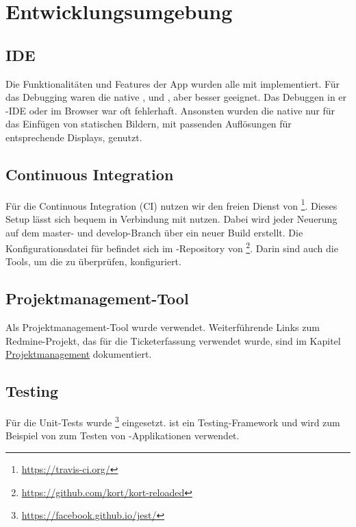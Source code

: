 \chapter{Entwicklungsumgebung}
\label{pd-entwicklungsumgebung}


\section{IDE}
Die Funktionalitäten und Features der App wurden alle mit  implementiert. 
Für das Debugging waren die native ,  und , aber besser geeignet. 
Das Debuggen in er -\gls{IDE} oder im  Browser war oft fehlerhaft. 
Ansonsten wurden die native  nur für das Einfügen von statischen Bildern, mit passenden Auflösungen für entsprechende Displays, genutzt. 


\section{Continuous Integration}
Für die Continuous Integration (\gls{CI}) nutzen wir den freien Dienst von \footnote{\url{https://travis-ci.org/}}.
Dieses Setup lässt sich bequem in Verbindung mit  nutzen. 
Dabei wird jeder Neuerung auf dem master- und develop-Branch über  ein neuer Build erstellt. 
Die Konfigurationsdatei für  befindet sich im -Repository von \kort{}\footnote{\url{https://github.com/kort/kort-reloaded}}. 
Darin sind auch die Tools, um die  zu überprüfen, konfiguriert. 


\section{Projektmanagement-Tool}
Als Projektmanagement-Tool wurde  verwendet. 
Weiterführende Links zum Redmine-Projekt, das für die Ticketerfassung verwendet wurde, sind im Kapitel \hyperref[pm-projektmanagement]{Projektmanagement} dokumentiert.


\section{Testing}
Für die Unit-Tests wurde \footnote{\url{https://facebook.github.io/jest/}} eingesetzt. 
 ist ein  Testing-\gls{Framework} und wird zum Beispiel von  zum Testen von -Applikationen verwendet. 


